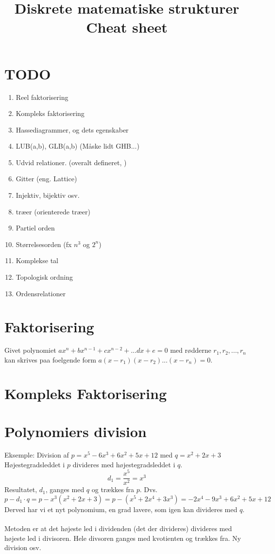 \documentclass[a4paper]{article}
\title{Diskrete matematiske strukturer\\
          Cheat sheet}
\author {}
\date{}
\begin{document}
\maketitle
\tableofcontents
\clearpage
\section{TODO}
  \begin{enumerate}
    \item Reel faktorisering
    \item Kompleks faktorisering
    \item Hassediagrammer, og dets egenskaber
    \item LUB(a,b), GLB(a,b) (Måske lidt GHB...)
    \item Udvid relationer. (overalt defineret, )
    \item Gitter (eng. Lattice)
    \item Injektiv, bijektiv osv.
    \item træer (orienterede træer)
    \item Partiel orden %
    \item Størrelsesorden (fx $n^3$ og $2^n$)
    \item Komplekse tal
    \item Topologisk ordning %
    \item Ordensrelationer %
  \end{enumerate}
\section{Faktorisering}
 Givet polynomiet $ax^n + bx^{n-1} + cx^{n-2} + ... dx + e = 0$ med rødderne $r_1, r_2, ..., r_n$ kan skrives paa foelgende form $a(x - r_1)(x - r_2)...(x-r_n)=0$.\\
 
\section{Kompleks Faktorisering}
\section{Polynomiers division}
 Eksemple: Division af $p = x^5 - 6x^3 + 6x^2 + 5x + 12$ med $q = x^2 + 2x + 3$\\
 Højestegradsleddet i $p$ divideres med højestegradsleddet i $q$.
 $$d_1 = \frac{x^5}{x^2} = x^3$$
 Resultatet, $d_1$, ganges med $q$ og trækkes fra $p$. Dvs.
 $$p - d_1 \cdot q = p - x^3(x^2 + 2x + 3) = p - (x^5 + 2x^4 + 3x^3) = -2x^4 - 9x^3 + 6x^2 + 5x + 12$$
 Derved har vi et nyt polynomium, en grad lavere, som igen kan divideres med $q$.\\\\
 Metoden er at det højeste led i dividenden (det der divideres) divideres med højeste led i divisoren. Hele divsoren ganges med kvotienten og trækkes fra. Ny division osv.
\end{document}
